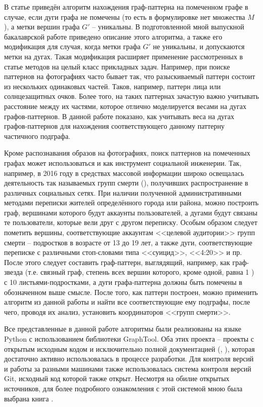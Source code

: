 В статье \cite{patmat} приведён алгоритм нахождения граф-паттерна на помеченном графе в случае, если дуги графа не помечены (то есть в формулировке нет множества $M$), а метки вершин графа $G'$ -- уникальны. В подготовленной мной выпускной бакалаврской работе приведено описание этого алгоритма, а также его модификация для случая, когда метки графа $G'$ не уникальны, и допускаются метки на дугах. Такая модификация расширяет применение рассмотренных в статье \cite{patmat} методов на целый класс прикладных задач. Например, при поиске паттернов на фотографиях часто бывает так, что разыскиваемый паттерн состоит из нескольких одинаковых частей. Таков, например, паттерн лица или солнцезащитных очков. Более того, на таких паттернах зачастую важно учитывать расстояние между их частями, которое отлично моделируется весами на дугах графов-паттернов. В данной работе показано, как учитывать веса на дугах графов-паттернов для нахождения соответствующего данному паттерну частичного подграфа.

Кроме распознавания образов на фотографиях, поиск паттернов на помеченных графах может использоваться и как инструмент социальной инженерии. Так, например, в 2016 году в средствах массовой информации широко освещалась деятельность так называемых групп смерти (\cite{sinkit}), получивших распространение в различных социальных сетях. При наличии полученной административными методами переписки жителей определённого города или района, можно построить граф, вершинами которого будут аккаунты пользователей, а дугами будут связаны те пользователи, которые вели друг с другом переписку. Особым образом следует пометить вершины, соответствующие аккаунтам <<целевой аудитории>> групп смерти -- подростков в возрасте от 13 до 19 лет, а также дуги, соответствующие переписке с различными стоп-словами типа <<суицид>>, <<4:20>> и пр. После этого следует составить граф-паттерн, выглядящий, например, как граф-звезда (т.е. связный граф, степень всех вершин которого, кроме одной, равна 1 \cite{stargraph}) с 10 листьями-подростками, а дуги графа-паттерна должны быть помечены в обозначенном выше смысле. После того, как паттерн построен, можно применить алгоритм из данной работы и найти все соответствующие ему подграфы, после чего, проводя их анализ, установить координаторов <<групп смерти>>.

Все представленные в данной работе алгоритмы были реализованы на языке Python с использованием библиотеки GraphTool. Оба этих проекта -- проекты с открытым исходным кодом и исключительно полной документацией (\cite{pythdoc}, \cite{graphtool}), которая достаточно активно использовалась в процессе разработки. Для контроля версий и работы за разными машинами также использовалась система контроля версий Git, исходный код которой также открыт. Несмотря на обилие открытых источников, для более подробного ознакомления с этой системой мною была выбрана книга \cite{gitbook}.